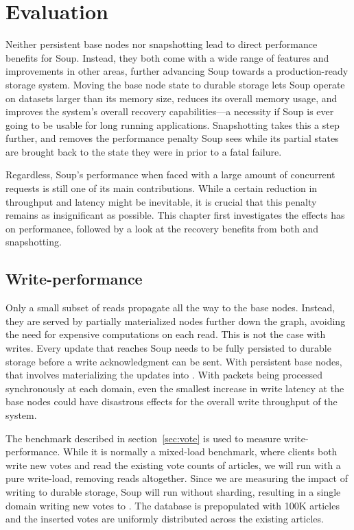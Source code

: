 \chapter{Evaluation}\label{chap:evaluation}

Neither persistent base nodes nor snapshotting lead to direct performance
benefits for Soup. Instead, they both come with a wide range of features and
improvements in other areas, further advancing Soup towards a production-ready
storage system. Moving the base node state to durable storage lets Soup operate
on datasets larger than its memory size, reduces its overall memory usage, and
improves the system's overall recovery capabilities---a necessity if Soup is
ever going to be usable for long running applications. Snapshotting takes this a
step further, and removes the performance penalty Soup sees while its partial
states are brought back to the state they were in prior to a fatal failure.

Regardless, Soup's performance when faced with a large amount of concurrent
requests is still one of its main contributions. While a certain reduction in
throughput and latency might be inevitable, it is crucial that this penalty
remains as insignificant as possible. This chapter first investigates the
effects  has on performance, followed by a look at the
recovery benefits from both  and snapshotting.

\newpage

\section{Write-performance}\label{sec:write-throughput}

Only a small subset of reads propagate all the way to the base nodes. Instead,
they are served by partially materialized nodes further down the graph, avoiding
the need for expensive computations on each read. This is not the case with
writes. Every update that reaches Soup needs to be fully persisted to durable
storage before a write acknowledgment can be sent. With persistent base nodes,
that involves materializing the updates into . With
packets being processed synchronously at each domain, even the smallest increase
in write latency at the base nodes could have disastrous effects for the overall
write throughput of the system.

The  benchmark described in section~\ref{sec:vote} is used to measure
write-performance. While it is normally a mixed-load benchmark, where clients
both write new votes and read the existing vote counts of articles, we will run
 with a pure write-load, removing reads altogether. Since we are
measuring the impact of writing to durable storage, Soup will run without
sharding, resulting in a single domain writing new votes to
. The database is prepopulated with 100K articles and the
inserted votes are uniformly distributed across the existing articles.

